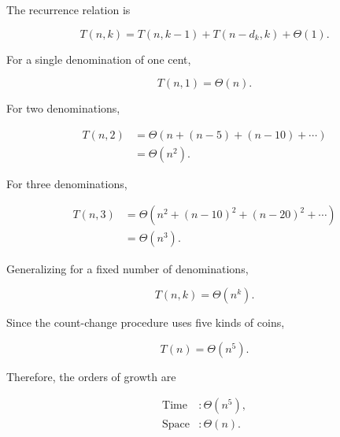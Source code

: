 \documentclass[10pt,letterpaper]{article}
\begin{document}
The recurrence relation is

\[
    T(n,k) =
    T(n,k-1) + T(n-d_k,k) + \Theta(1).
\]

For a single denomination of one cent,

\[
    T(n,1)=\Theta(n).
\]

For two denominations,

\begin{align*}
    T(n,2)
        &= \Theta(n+(n-5)+(n-10)+\cdots)\\
        &= \Theta(n^2).
\end{align*}

For three denominations,

\begin{align*}
    T(n,3)
        &= \Theta(n^2+(n-10)^2+
           (n-20)^2+\cdots)\\
        &= \Theta(n^3).
\end{align*}

Generalizing for a fixed number of denominations,

\[
    T(n,k)=\Theta(n^k).
\]

Since the count-change procedure uses five
kinds of coins,

\[
    \boxed{T(n)=\Theta(n^5)}.
\]

Therefore, the orders of growth are

\[
\boxed{
\begin{aligned}
    \text{Time}  &: \Theta(n^5),\\
    \text{Space} &: \Theta(n).
\end{aligned}
}
\]
\end{document}
